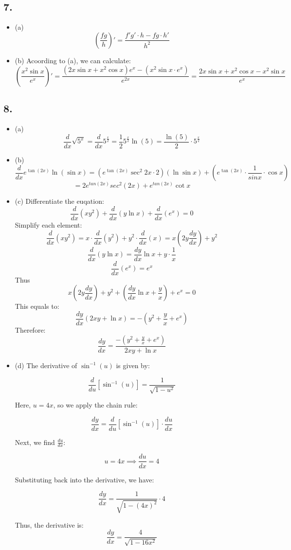 \documentclass[a4paper, 7pt]{article}
\begin{document}
\subsection*{7.}
\begin{itemize}
    \item (a)
    \[
    (\frac{fg}{h})' = \frac{f'g'\cdot h-fg\cdot h'}{h^2}
    \]
    \item (b)
    Acoording to (a), we can calculate:
    \[
    (\frac{x^2 \sin x}{e^x})' = \frac{(2x\sin x + x^2\cos x)e^x-(x^2 \sin x \cdot e^x)}{e^{2x}} = \frac{2x\sin x +x^2\cos x- x^2\sin x}{e^x}
    \]
\end{itemize}
\subsection*{8.}
\begin{itemize}
    \item (a)
    \[
    \frac{d}{dx} \sqrt{5^x} = \frac{d}{dx} 5^{\frac{x}{2}} = \frac{1}{2} 5^{\frac{x}{2}} \ln(5) = \frac{\ln(5)}{2}\cdot 5^\frac{x}{2}
    \]
    \item (b)
    \[
    \frac{d}{dx} e^{\tan(2x)} \ln(\sin x) = (e^{\tan(2x)} \sec^2 2x \cdot 2) (\ln \sin x) + (e^{\tan(2x)} \cdot \frac{1}{sinx} \cdot \cos x)
    \]
    \[
    = 2e^{tan(2x)} sec^2 (2x) + e^{tan(2x)}\cot x 
    \]
    \item (c)
    Differentiate the euqation:
    \[
    \frac{d}{dx} (xy^2) + \frac{d}{dx} (y\ln x) + \frac{d}{dx} (e^x) = 0
    \]
    Simplify each element:
    \[
    \frac{d}{dx}(xy^2) = x \cdot \frac{d}{dx}(y^2) + y^2 \cdot \frac{d}{dx}(x) = x(2y \frac{dy}{dx}) + y^2
    \]
    \[
    \frac{d}{dx}(y \ln x) = \frac{dy}{dx} \ln x + y \cdot \frac{1}{x}
    \]
    \[
    \frac{d}{dx}(e^x) = e^x
    \]
    Thus
    \[
    x(2y \frac{dy}{dx}) + y^2 + \left(\frac{dy}{dx} \ln x + \frac{y}{x}\right) + e^x = 0
    \]
    This equals to:
    \[
    \frac{dy}{dx}(2xy + \ln x) = -\left(y^2 + \frac{y}{x} + e^x\right)
    \]
    Therefore:
    \[
    \frac{dy}{dx} = \frac{-(y^2 + \frac{y}{x} + e^x)}{2xy + \ln x}
    \]
    \item (d)
    The derivative of \( \sin^{-1}(u) \) is given by:

    \[
    \frac{d}{du}[\sin^{-1}(u)] = \frac{1}{\sqrt{1 - u^2}}
    \]

    Here, \( u = 4x \), so we apply the chain rule:

    \[
    \frac{dy}{dx} = \frac{d}{du}[\sin^{-1}(u)] \cdot \frac{du}{dx}
    \]

    Next, we find \( \frac{du}{dx} \):

    \[
    u = 4x \implies \frac{du}{dx} = 4
    \]

    Substituting back into the derivative, we have:

\[
\frac{dy}{dx} = \frac{1}{\sqrt{1 - (4x)^2}} \cdot 4
\]

Thus, the derivative is:
\[
\frac{dy}{dx} = \frac{4}{\sqrt{1 - 16x^2}}
\]
\end{itemize}
\end{document}
